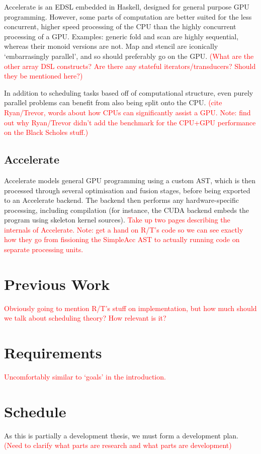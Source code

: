 \documentclass[a4paper,12pt]{article}
\newcommand{\red}[1]{\textcolor{red}{#1}}
\begin{document}
\begin{multicols*}{2}
Accelerate is an EDSL embedded in Haskell, designed for general purpose GPU programming. However, some parts of computation are better suited for the less concurrent, higher speed processing of the CPU than the highly concurrent processing of a GPU. Examples: generic fold and scan are highly sequential, whereas their monoid versions are not. Map and stencil are iconically `embarrasingly parallel', and so should preferably go on the GPU. \red{(What are the other array DSL constructs? Are there any stateful iterators/transducers? Should they be mentioned here?)}

In addition to scheduling tasks based off of computational structure, even purely parallel problems can benefit from also being split onto the CPU. \red{(cite Ryan/Trevor, words about how CPUs can significantly assist a GPU. Note: find out why Ryan/Trevor didn't add the benchmark for the CPU+GPU performance on the Black Scholes stuff.)}

\subsection{Accelerate}

Accelerate models general GPU programming using a custom AST, which is then processed through several optimisation and fusion stages, before being exported to an Accelerate backend. The backend then performs any hardware-specific processing, including compilation (for instance, the CUDA backend embeds the program using skeleton kernel sources). \red{Take up two pages describing the internals of Accelerate. Note: get a hand on R/T's code so we can see exactly how they go from fissioning the SimpleAcc AST to actually running code on separate processing units.}


\section{Previous Work}

\red{Obviously going to mention R/T's stuff on implementation, but how much should we talk about scheduling theory? How relevant is it?}


\section{Requirements}

\red{Uncomfortably similar to `goals' in the introduction.}


\section{Schedule}

As this is partially a development thesis, we must form a development plan. \red{(Need to clarify what parts are research and what parts are development)}



\begin{thebibliography}{99}
\end{thebibliography}

\end{multicols*}
\end{document}
